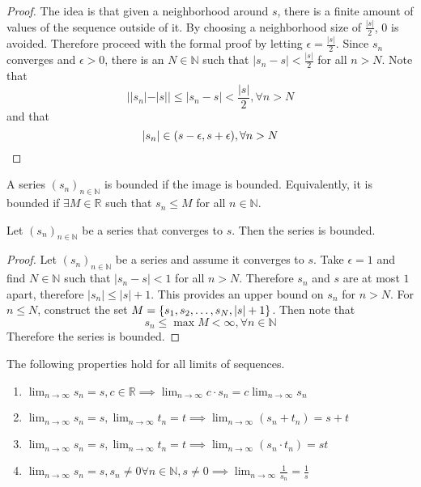 \documentclass[../notes.tex]{subfiles}
\begin{document}
\begin{proof}
	The idea is that given a neighborhood around $s$, there is a finite amount of values of the sequence outside of it. By choosing a neighborhood size of $\frac{|s|}{2}$, 0 is avoided. Therefore proceed with the formal proof by letting $\epsilon = \frac{|s|}{2}$. Since $s_n$ converges and $\epsilon > 0$, there is an $N \in \mathbb{N}$ such that $|s_n - s| < \frac{|s|}{2}$ for all $n > N$. Note that
	\[
		||s_n| - |s|| \leq |s_n - s| < \frac{|s|}{2}, \forall n > N
	\]
	and that
	\[
		|s_n| \in \qty(s - \epsilon, s + \epsilon), \forall n > N
	\]
\end{proof}

\begin{definition}
	A series $(s_n)_{n\in \mathbb{N}}$ is bounded if the image is bounded. Equivalently, it is bounded if $\exists M \in \mathbb{R}$ such that $s_n \leq M$ for all $n \in \mathbb{N}$.
\end{definition}

\begin{theorem}
	Let $(s_n)_{n\in \mathbb{N}}$ be a series that converges to $s$. Then the series is bounded.
\end{theorem}

\begin{proof}
	Let $(s_n)_{n\in \mathbb{N}}$ be a series and assume it converges to $s$. Take $\epsilon = 1$ and find $N \in \mathbb{N}$ such that $|s_n - s| < 1$ for all $n > N$. Therefore $s_n$ and $s$ are at most $1$ apart, therefore $|s_n| \leq |s| + 1$. This provides an upper bound on $s_n$ for $n > N$. For $n \leq N$, construct the set $M = \qty{s_1, s_2, \ldots, s_N, |s| + 1}$. Then note that
	\[
		s_n \leq \max M < \infty, \forall n \in \mathbb{N} 
	\]
	Therefore the series is bounded.
\end{proof}

\begin{theorem}
	\label{thm:propsoflimits}
	The following properties hold for all limits of sequences.
	\begin{enumerate}[label=\alph*)]
		\item $\lim_{n\to\infty} s_n = s, c \in \mathbb{R} \implies \lim_{n\to\infty} c\cdot s_n = c\lim_{n\to\infty} s_n$
		\item $\lim_{n\to\infty} s_n = s, \lim_{n\to\infty} t_n = t \implies \lim_{n\to\infty} (s_n + t_n) = s + t$
		\item $\lim_{n\to\infty} s_n = s, \lim_{n\to\infty} t_n = t \implies \lim_{n\to\infty} (s_n \cdot t_n) = st$
		\item $\lim_{n\to\infty} s_n = s, s_n \neq 0 \forall n \in \mathbb{N}, s \neq 0 \implies \lim_{n\to\infty} \frac{1}{s_n} = \frac{1}{s}$
	\end{enumerate}
\end{theorem}
\end{document}
